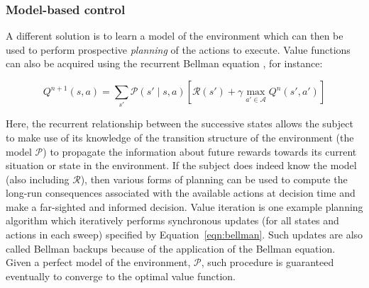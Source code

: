 
\subsubsection*{Model-based control}

A different solution is to learn a model of the environment which can then be used to perform prospective \emph{planning} of the actions to execute. Value functions can also be acquired using the recurrent Bellman equation \parencite{bellmanTheoryDynamicProgramming1954}, for instance:

\begin{equation}
    Q^{n+1}(s, a) =  \sum_{s'}\mathcal{P}(s'\mid s, a)\left[\mathcal{R}(s') + \gamma \max_{a'\in\mathcal{A}} Q^{n}(s', a') \right]
    \label{eqn:bellman}
\end{equation}

Here, the recurrent relationship between the successive states allows the subject to make use of its knowledge of the transition structure of the environment (the model $\mathcal{P}$) to propagate the information about future rewards towards its current situation or state in the environment. If the subject does indeed know the model (also including $\mathcal{R}$), then various forms of planning can be used to compute the long-run consequences associated with the available actions at decision time and make a far-sighted and informed decision. Value iteration \parencite{bellmanTheoryDynamicProgramming1954} is one example planning algorithm which iteratively performs synchronous updates (for all states and actions in each sweep) specified by Equation~\ref{eqn:bellman}. Such updates are also called Bellman backups because of the application of the Bellman equation. Given a perfect model of the environment, $\mathcal{P}$, such procedure is guaranteed eventually to  converge to the optimal value function.

